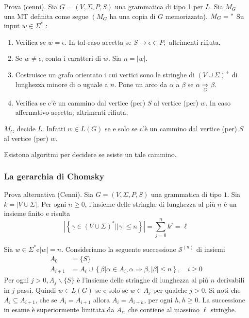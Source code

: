 Prova (cenni). Sia $G=(V, \Sigma, P, S)$ una grammatica di tipo 1 per $L$. Sia $M_{G}$ una MT definita come segue $\left(M_{G}\right.$ ha una copia di $G$ memorizzata).
$M_{G}="$ Su input $w \in \Sigma^{*}$ :
\begin{enumerate}
    \item Verifica se $w=\epsilon$. In tal caso accetta se $S \rightarrow \epsilon \in P ;$ altrimenti rifiuta.
    \item Se $w \neq \epsilon$, conta i caratteri di $w$. Sia $n=|w|$.
    \item Costruisce un grafo orientato i cui vertici sono le stringhe di $(V \cup \Sigma)^{+}$ di lunghezza minore di o uguale a $n$. Pone un arco da $\alpha$ a $\beta$ se $\alpha \underset{G}{\stackrel{}{\Rightarrow}} \beta$.
    \item Verifica se c'è un cammino dal vertice (per) $S$ al vertice (per) $w$. In caso affermativo accetta; altrimenti rifiuta.
\end{enumerate}
$M_{G}$ decide $L$.
Infatti $w \in L(G)$ se e solo se c'è un cammino dal vertice (per) $S$ al vertice (per) $w$.

Esistono algoritmi per decidere se esiste un tale cammino.

\subsubsection{La gerarchia di Chomsky}

Prova alternativa (Cenni). 
Sia $G=(V, \Sigma, P, S)$ una grammatica di tipo $1 .$
Sia $k=|V \cup \Sigma|$. Per ogni $n \geq 0$, l'insieme delle stringhe di lunghezza al più $n$ è un insieme finito e risulta
$$
\left|\left\{\gamma \in(V \cup \Sigma)^{*}|| \gamma \mid \leq n\right\}\right|=\sum_{j=0}^{n} k^{j}=\ell
$$

\vspace{5mm}

Sia $w \in \Sigma^{*} \mathrm{e}|w|=n$. Consideriamo la seguente successione $\mathcal{S}^{(n)}$ di insiemi
$$
\begin{aligned}
A_{0} &=\{S\} \\
A_{i+1} &=A_{i} \cup\left\{\beta\left|\alpha \in A_{i}, \alpha \Rightarrow \beta,\right| \beta \mid \leq n\right\}, \quad i \geq 0
\end{aligned}
$$
Per ogni $j>0, A_{j} \backslash\{S\}$ è l'insieme delle stringhe di lunghezza al più $n$ derivabili in $j$ passi. Quindi $w \in L(G)$ se e solo se $w \in A_{j}$ per qualche $j>0$.
Si noti che $A_{i} \subseteq A_{i+1}$, che se $A_{i}=A_{i+1}$ allora $A_{i}=A_{i+h}$, per ogni $h, h \geq 0$.
La successione in esame è superiormente limitata da $A_{\ell}$, che contiene al massimo $\ell$ stringhe.


